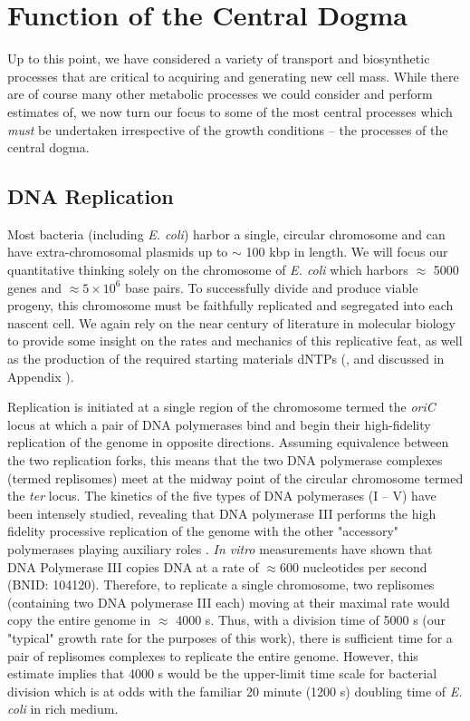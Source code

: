 \section{Function of the Central Dogma}
Up to this point, we have considered a variety of transport and biosynthetic
processes that are critical to acquiring and generating new cell mass. While
there are of course many other metabolic processes we could consider and
perform estimates of, we now turn our focus to some of the most central processes
which \textit{must} be undertaken irrespective of the growth conditions --
the processes of the central dogma.


\subsection{DNA Replication}
Most bacteria (including \textit{E. coli}) harbor a single, circular chromosome
and can have extra-chromosomal plasmids up to $\sim$ 100 kbp in length. We will focus
our quantitative thinking solely on the chromosome of \textit{E. coli} which
harbors $\approx$ 5000 genes and $\approx 5\times 10^6$ base pairs. To
successfully divide and produce viable progeny, this chromosome must be
faithfully replicated and segregated into each nascent cell. We again rely on
the near century of literature in molecular biology to provide some insight on
the rates and mechanics of this replicative feat, as well as the production of the
required starting materials dNTPs (, and discussed in Appendix ).


Replication is initiated at a
single region of the chromosome termed the \textit{oriC} locus at which a pair
of DNA polymerases bind and begin their high-fidelity replication of the genome
in opposite directions. Assuming equivalence between the two replication forks,
this means that the two DNA polymerase complexes (termed replisomes) meet at the
midway point of the circular chromosome termed the \textit{ter} locus. The
kinetics of the five types of DNA polymerases (I -- V) have been intensely
studied, revealing that DNA polymerase III performs the high fidelity processive
replication of the genome with the other "accessory" polymerases playing
auxiliary roles \citep{fijalkowska2012}. \textit{In vitro} measurements have
shown that DNA Polymerase III copies DNA at a rate of $\approx 600$ nucleotides
per second (BNID: 104120). Therefore, to replicate a single
chromosome, two replisomes (containing two DNA polymerase III each) moving at their maximal rate would copy the
entire genome in $\approx$ 4000 s. Thus, with a division time of 5000 s (our
"typical" growth rate for the purposes of this work), there is sufficient time
for a pair of replisomes complexes to replicate the entire genome.
However, this estimate implies that 4000 s would be the upper-limit time scale
for bacterial division which is at odds with the familiar 20 minute (1200 s)
doubling time of \textit{E. coli} in rich medium.

